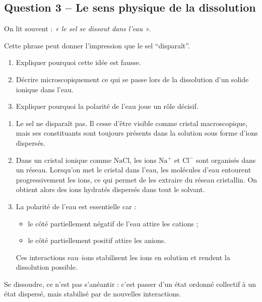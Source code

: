 \documentclass[11pt,a4paper]{article}
\begin{document}
\subsection{Question 3 -- Le sens physique de la dissolution}

\begin{enoncebox}
On lit souvent : \textit{« le sel se dissout dans l'eau »}.  

Cette phrase peut donner l'impression que le sel ``disparaît''.

\begin{enumerate}[label=\arabic*)]
    \item Expliquer pourquoi cette idée est fausse.
    \item Décrire microscopiquement ce qui se passe lors de la dissolution d'un solide ionique dans l'eau.
    \item Expliquer pourquoi la polarité de l'eau joue un rôle décisif.
\end{enumerate}
\end{enoncebox}

\begin{corrigebox}
\begin{enumerate}[label=\arabic*)]
    \item Le sel ne disparaît pas.  
    Il cesse d'être visible comme cristal macroscopique, mais ses constituants sont toujours présents dans la solution sous forme d'ions dispersés.
    
    \item Dans un cristal ionique comme \(\mathrm{NaCl}\), les ions \(\mathrm{Na^+}\) et \(\mathrm{Cl^-}\) sont organisés dans un réseau.  
    Lorsqu'on met le cristal dans l'eau, les molécules d'eau entourent progressivement les ions, ce qui permet de les extraire du réseau cristallin.  
    On obtient alors des ions hydratés dispersés dans tout le solvant.
    
    \item La polarité de l'eau est essentielle car :
    \begin{itemize}
        \item le côté partiellement négatif de l'eau attire les cations ;
        \item le côté partiellement positif attire les anions.
    \end{itemize}
    Ces interactions eau--ions stabilisent les ions en solution et rendent la dissolution possible.
\end{enumerate}

\begin{ideebox}
Se dissoudre, ce n'est pas s'anéantir : c'est passer d'un état ordonné collectif à un état dispersé, mais stabilisé par de nouvelles interactions.
\end{ideebox}
\end{corrigebox}
\end{document}
